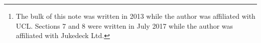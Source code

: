 \documentclass[a4paper,10pt]{article}
\date{13th July, 2017\footnote{The bulk of this note was written in 2013 while the author
was affiliated with UCL. Sections 7 and 8 were written in July 2017 while the author was affiliated with Jukedeck Ltd.}}
\title{\TheTitle}
\author{\TheAuthors}
\begin{document}
	\maketitle
	\begin{abstract}\TheAbstract\end{abstract}
	

	
	{}
\end{document}
